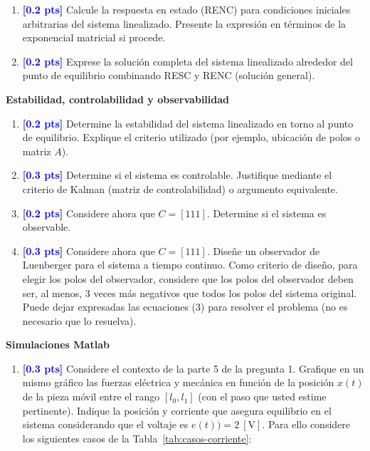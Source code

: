 \documentclass[
  11pt,
  letterpaper,
   addpoints,
  ]{exam}
\begin{document}
\begin{questions}
\begin{enumerate}
  \item \textcolor{blue}{\textbf{[0.2 pts]}} Calcule la respuesta en estado (RENC) para condiciones iniciales arbitrarias del sistema linealizado. Presente la expresión en términos de la exponencial matricial si procede.

  \item \textcolor{blue}{\textbf{[0.2 pts]}} Exprese la solución completa del sistema linealizado alrededor del punto de equilibrio combinando RESC y RENC (solución general).
\end{enumerate}

\question \textbf{Estabilidad, controlabilidad y observabilidad}
\begin{enumerate}
  \item \textcolor{blue}{\textbf{[0.2 pts]}} Determine la estabilidad del sistema linealizado en torno al punto de equilibrio. Explique el criterio utilizado (por ejemplo, ubicación de polos o matriz $A$).

  \item \textcolor{blue}{\textbf{[0.3 pts]}} Determine si el sistema es controlable. Justifique mediante el criterio de Kalman (matriz de controlabilidad) o argumento equivalente.

  \item \textcolor{blue}{\textbf{[0.2 pts]}} Considere ahora que $C = [111]$. Determine si el sistema es observable.

  \item \textcolor{blue}{\textbf{[0.3 pts]}} Considere ahora que $C = [111]$. Diseñe un observador de Luenberger para el sistema a tiempo continuo. Como criterio de diseño, para elegir los polos del observador, considere que los polos del observador deben ser, al menos, 3 veces más negativos que todos los polos del sistema original. Puede dejar expresadas las ecuaciones (3) para resolver el problema (no es necesario que lo resuelva).
\end{enumerate}

\question \textbf{Simulaciones Matlab}

\begin{enumerate}
  \item \textcolor{blue}{\textbf{[0.3 pts]}} Considere el contexto de la parte 5 de la pregunta 1. Grafique en un mismo gráfico las fuerzas eléctrica y mecánica en función de la posición $x(t)$ de la pieza móvil entre el rango $[l_0, l_1]$ (con el paso que usted estime pertinente). Indique la posición y corriente que asegura equilibrio en el sistema considerando que el voltaje es $e(t)) = 2~[\text{V}]$. Para ello considere los siguientes casos de la Tabla~\ref{tab:casos-corriente}:


\end{enumerate}
\end{questions}
\end{document}
